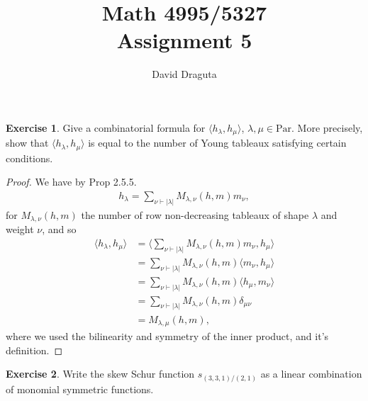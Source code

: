 \documentclass[12pt]{extarticle}
\title{ Math 4995/5327
  \\
  Assignment 5}
\author{David Draguta}
\newcommand{\abs}[1]{|#1|}
\newcommand{\<}{\langle}
\renewcommand{\>}{\rangle}
\theoremstyle{definition}
\newtheorem{exercise}{Exercise}
\begin{document}
\maketitle

\begin{exercise}
  Give a combinatorial formula for $\< h_{\lambda}, h_{\mu} \>$, $\lambda, \mu \in \text{Par}$. More precisely, show that $\<h_{\lambda}, h_{\mu}\>$ is equal to the number of Young tableaux satisfying certain conditions. 
\end{exercise}
\begin{proof}
  We have by Prop 2.5.5.
  \begin{align*}
    h_{\lambda} = \sum\limits_{\nu \vdash \abs{\lambda}} M_{\lambda, \nu}(h,m)m_{\nu},
  \end{align*}
   for $M_{\lambda, \nu}(h,m)$ the number of row non-decreasing tableaux of shape $\lambda$ and weight $\nu$, and so
  \begin{align*}
    \< h_{\lambda}, h_{\mu} \>
    &= \< \sum\limits_{\nu \vdash \abs{\lambda}} M_{\lambda, \nu}(h,m)m_{\nu}, h_{\mu} \> \\
    &= \sum\limits_{\nu \vdash \abs{\lambda}} M_{\lambda, \nu}(h,m) \< m_{\nu}, h_{\mu} \> \\
    &= \sum\limits_{\nu \vdash \abs{\lambda}} M_{\lambda, \nu}(h,m) \< h_{\mu}, m_{\nu}\> \\
    &= \sum\limits_{\nu \vdash \abs{\lambda}} M_{\lambda, \nu}(h,m) \delta_{\mu \nu} \\
    &= M_{\lambda, \mu}(h,m),
  \end{align*}
  where we used the bilinearity and symmetry of the inner product, and it's definition.
\end{proof}
\begin{exercise}
  Write the skew Schur function $s_{(3,3,1)/(2,1)}$ as a linear combination of monomial symmetric functions. 
\end{exercise}
\end{document}
